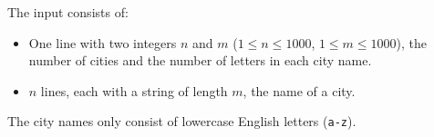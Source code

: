 
    The input consists of:
    \begin{itemize}
        \item One line with two integers $n$ and $m$ ($1\leq n\leq 1000$, $1 \leq m \leq 1000$),
            the number of cities and the number of letters in each city name.
        \item $n$ lines, each with a string of length $m$, the name of a city.
    \end{itemize}
    The city names only consist of lowercase English letters (\texttt{a-z}).
